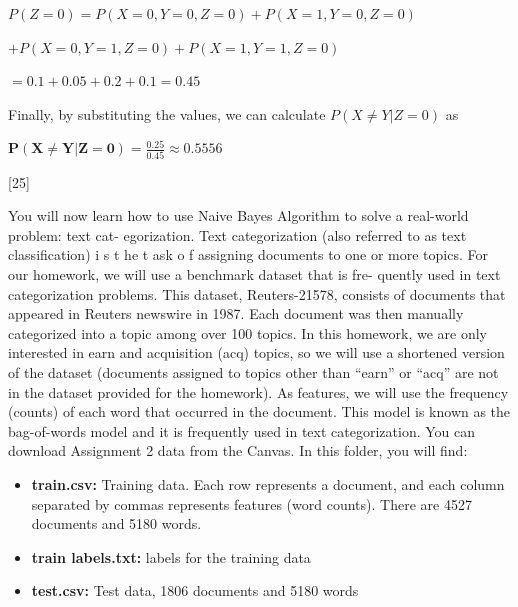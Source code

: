 \documentclass[12pt,letterpaper, onecolumn]{exam}
\begin{document}
\begin{questions}
\begin{parts}
\begin{subparts}
\begin{solution}
                \begin{center}
                    $\displaystyle{P(Z=0) = P(X=0, Y=0, Z=0) + P(X=1, Y=0, Z=0)}$

                    $\displaystyle{+ P(X=0, Y=1, Z=0) + P(X=1, Y=1, Z=0)}$

                    $\displaystyle{= 0.1 + 0.05 + 0.2 + 0.1 = 0.45}$
                \end{center}

                Finally, by substituting the values, we can calculate $P(X \neq Y | Z = 0)$ as

                \begin{center}
                    $\boldsymbol{\displaystyle{P(X \neq Y | Z = 0) = \frac{0.25}{0.45} \approx 0.5556}}$
                \end{center}
                
                
            \end{solution}
            
        \end{subparts}
  
    \end{parts}

    \pagebreak

    [25]

    You will now learn how to use Naive Bayes Algorithm to solve a real-world problem: text cat-
    egorization. Text categorization (also referred to as text classification) i s t he t ask o f assigning
    documents to one or more topics. For our homework, we will use a benchmark dataset that is fre-
    quently used in text categorization problems. This dataset, Reuters-21578, consists of documents that
    appeared in Reuters newswire in 1987. Each document was then manually categorized into a topic
    among over 100 topics. In this homework, we are only interested in earn and acquisition (acq) topics,
    so we will use a shortened version of the dataset (documents assigned to topics other than “earn” or
    “acq” are not in the dataset provided for the homework). As features, we will use the frequency
    (counts) of each word that occurred in the document. This model is known as the bag-of-words model
    and it is frequently used in text categorization. You can download Assignment 2 data from the Canvas.
    In this folder, you will find:

    \begin{itemize}
        \item \textbf{train.csv:} Training data. Each row represents a document, and each column separated by
        commas represents features (word counts). There are 4527 documents and 5180 words.
        \item \textbf{train labels.txt:} labels for the training data
        \item \textbf{test.csv:} Test data, 1806 documents and 5180 words
    \end{itemize}


\end{questions}
\end{document}
